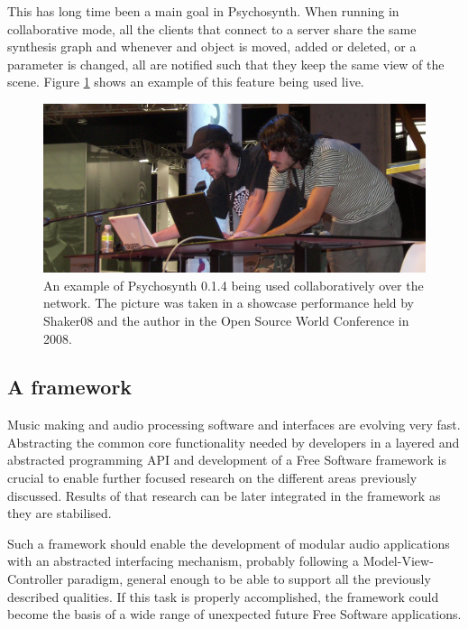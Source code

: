 This has long time been a main goal in Psychosynth. When running in
collaborative mode, all the clients that connect to a server share the
same synthesis graph and whenever and object is moved, added or
deleted, or a parameter is changed, all are notified such that they
keep the same view of the scene. Figure \ref{fig:collab} shows an
example of this feature being used live.

\begin{figure}[h!]
\centering
\includegraphics[width=.9\textwidth]{pic/collab.jpg}
\caption[An example of Psychosynth 0.1.4 being used collaboratively
over the network.]{An example of Psychosynth 0.1.4 being used
  collaboratively over the network. The picture was taken in a
  showcase performance held by Shaker08 and the author in the Open
  Source World Conference in 2008.}
\label{fig:collab}
\end{figure}

\subsection{A framework}

Music making and audio processing software and interfaces are evolving
very fast. Abstracting the common core functionality needed by
developers in a layered and abstracted programming API and development
of a Free Software \cite{stallman2002free} framework is crucial to enable
further focused research on the different areas previously
discussed. Results of that research can be later integrated in the
framework as they are stabilised.

Such a framework should enable the development of modular audio
applications with an abstracted interfacing mechanism, probably
following a Model-View-Controller paradigm, general enough to be able
to support all the previously described qualities. If this task is
properly accomplished, the framework could become the basis of a wide
range of unexpected future Free Software applications.

